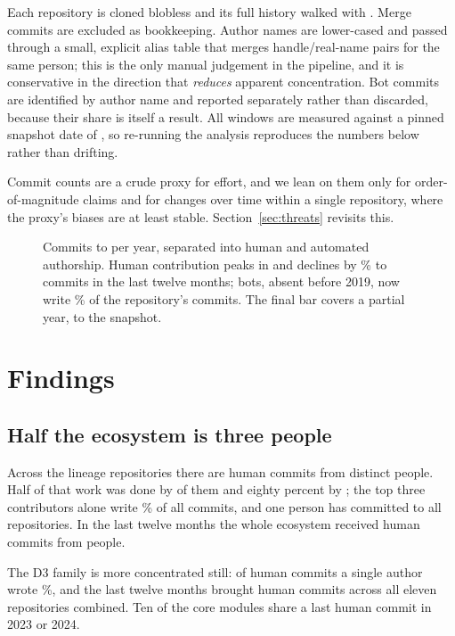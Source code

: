 \documentclass[9pt,twocolumn,letterpaper]{article}
\begin{document}
Each repository is cloned blobless and its full history walked with
. Merge commits are excluded as bookkeeping. Author
names are lower-cased and passed through a small, explicit alias table that
merges handle/real-name pairs for the same person; this is the only manual
judgement in the pipeline, and it is conservative in the direction that
\emph{reduces} apparent concentration. Bot commits are identified by author
name and reported separately rather than discarded, because their share is
itself a result. All windows are measured against a pinned snapshot date of
\snapshot{}, so re-running the analysis reproduces the numbers below rather
than drifting.

Commit counts are a crude proxy for effort, and we lean on them only for
order-of-magnitude claims and for changes over time within a single repository,
where the proxy's biases are at least stable. Section~\ref{sec:threats}
revisits this.

\begin{figure}[t]
\centering

\caption{Commits to  per year, separated into human and
automated authorship. Human contribution peaks in \vlpeakyear{} and declines by
\vldecline\% to \vlrecent{} commits in the last twelve months; bots, absent
before 2019, now write \vlbotshare\% of the repository's commits. The final bar
covers a partial year, to the \snapshot{} snapshot.}
\label{fig:bots}
\end{figure}

\section{Findings}

\subsection{Half the ecosystem is three people}

Across the \ecorepos{} lineage repositories there are \ecocommits{} human
commits from \ecohumans{} distinct people. Half of that work was done by
\ecobusfifty{} of them and eighty percent by \ecobuseighty{}; the top three
contributors alone write \ecotopthree\% of all commits, and one person has
committed to all \ecorepos{} repositories. In the last twelve months the whole
ecosystem received \ecorecent{} human commits from \ecorecenthumans{} people.

The D3 family is more concentrated still: of \dthreecommits{} human commits a
single author wrote \dthreetop\%, and the last twelve months brought
\dthreerecent{} human commits across all eleven repositories combined. Ten of
the  core modules share a last human commit in 2023 or 2024.
\end{document}
